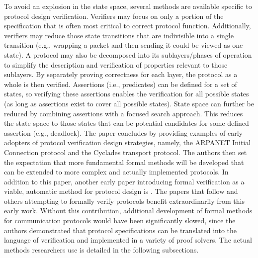 \documentclass[11pt, journal]{IEEEtran}
\begin{document}
\bigbreak
To avoid an explosion in the state space, several methods are available specific to protocol design verification. Verifiers may focus on only a portion of the specification that is often most critical to correct protocol function. Additionally, verifiers may reduce those state transitions that are indivisible into a single transition (e.g., wrapping a packet and then sending it could be viewed as one state). A protocol may also be decomposed into its sublayers/phases of operation to simplify the description and verification of properties relevant to those sublayers. By separately proving correctness for each layer, the protocol as a whole is then verified. Assertions (i.e., predicates) can be defined for a set of states, so verifying these assertions enables the verification for all possible states (as long as assertions exist to cover all possible states). State space can further be reduced by combining assertions with a focused search approach. This reduces the state space to those states that can be potential candidates for some defined assertion (e.g., deadlock). 
\bigbreak
The paper concludes by providing examples of early adopters of protocol verification design strategies, namely, the ARPANET Initial Connection protocol and the Cyclades transport protocol. The authors then set the expectation that more fundamental formal methods will be developed that can be extended to more complex and actually implemented protocols. In addition to this paper, another early paper introducing formal verification as a viable, automatic method for protocol design is \cite{Holzmann1990}. The papers that follow and others attempting to formally verify protocols benefit extraordinarily from this early work. Without this contribution, additional development of formal methods for communication protocols would have been significantly slowed, since the authors demonstrated that protocol specifications can be translated into the language of verification and implemented in a variety of proof solvers. The actual methods researchers use is detailed in the following subsections.
\bigbreak
\end{document}
